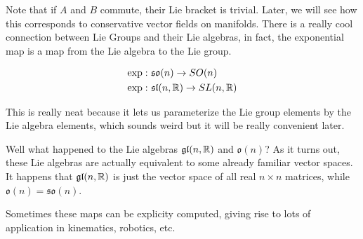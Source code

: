 Note that if $A$ and $B$ commute, their Lie bracket is trivial. Later, we will see
how this corresponds to conservative vector fields on manifolds. There is a really
cool connection between Lie Groups and their Lie algebras, in fact, the exponential
map is a map from the Lie algebra to the Lie group.

\begin{align}\label{eq:2}
    \exp: & \ \mathfrak{so}(n) \to SO(n)\\
    \exp: & \ \mathfrak{sl}(n, \mathbb{R}) \to SL(n, \mathbb{R})
\end{align}

This is really neat because it lets us parameterize the Lie group elements by the
Lie algebra elements, which sounds weird but it will be really convenient later.

Well what happened to the Lie algebras $\mathfrak{gl}(n, \mathbb{R})$ and $\mathfrak{o}(n)$?
As it turns out, these Lie algebras are actually equivalent to some already familiar
vector spaces. It happens that $\mathfrak{gl}(n, \mathbb{R})$ is just the vector space of
all real $n\times n$ matrices, while $\mathfrak{o}(n) = \mathfrak{so}(n)$.

Sometimes these maps can be explicity computed, giving rise to lots of application
in kinematics, robotics, etc.

